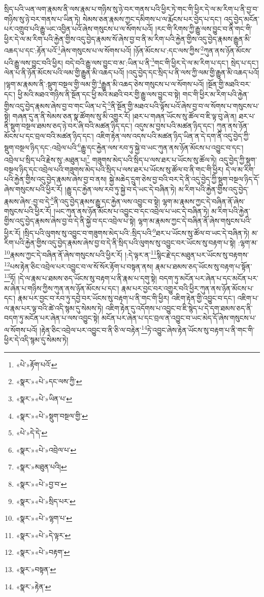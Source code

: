 སྲིད་པའི་ཡན་ལག་རྣམས་ནི་ལས་རྣམ་པ་གཉིས་སུ་ཉེ་བར་གནས་པའི་ཕྱིར་ཏེ་གང་གི་ཕྱིར་དེ་ལ་མ་རིག་པ་ནི་བྱ་བ་གཉིས་སུ་ཉེ་བར་གནས་པ་ཡིན་ཏེ། སེམས་ཅན་རྣམས་ཀྱང་དམིགས་པ་ལ་རྨོངས་པར་བྱེད་པ་དང་། འདུ་བྱེད་མངོན་པར་འགྲུབ་པའི་རྒྱུ་ཡང་འབྱིན་པའོ་ཞེས་གསུངས་པ་ལ་སོགས་པའོ། །རང་གི་རིགས་ཀྱི་རྒྱུ་ལས་བྱུང་བ་ནི་གང་གི་ཕྱིར་དེ་ལ་མ་རིག་པའི་རྐྱེན་གྱིས་འདུ་བྱེད་རྣམས་སོ་ཞེས་བྱ་བ་ནི་མ་རིག་པའི་རྐྱེན་གྱིས་འདུ་བྱེད་རྣམས་རྒྱུན་མི་འཆད་པ་དང་:རྟོན་པའོ་\footnote{«པེ་»རྟོག་པའོ་}ཞེས་གསུངས་པ་ལ་སོགས་པའོ། །ཉོན་མོངས་པ་:དང་ལས་ཀྱིས་\footnote{«སྣར་»«པེ་»དང་ལས་ཀྱི་}ཀུན་ནས་ཉོན་མོངས་པའི་རྒྱུ་ལས་བྱུང་བའི་ཕྱིར། བདེ་བའི་རྒྱུ་ལས་བྱུང་བ་མ་:ཡིན་པ་ནི་\footnote{«སྣར་»«པེ་»ཡིན་པ་}གང་གི་ཕྱིར་དེ་ལ་མ་རིག་པ་དང་། སྲེད་པ་དང་། ལེན་པ་ནི་ཉོན་མོངས་པའི་ལམ་གྱི་རྒྱུན་མི་འཆད་པའོ། །འདུ་བྱེད་དང་སྲིད་པ་ནི་ལས་ཀྱི་ལམ་གྱི་རྒྱུན་མི་འཆད་པའོ། །ལྷག་མ་རྣམས་ནི་:སྡུག་བསྔལ་གྱི་ལམ་གྱི་\footnote{«སྣར་»«པེ་»སྡུག་བསྔལ་གྱི་}རྒྱུན་མི་འཆད་ཅེས་གསུངས་པ་ལ་སོགས་པའོ། །སྔོན་གྱི་མཐའི་བར་དང་། ཕྱི་མའི་མཐའ་གཉིས་ནི་སྔོན་དང་ཕྱི་མའི་མཐའི་བར་གྱི་རྒྱུ་ལས་བྱུང་བ་སྟེ། གང་གི་ཕྱིར་མ་རིག་པའི་རྐྱེན་གྱིས་འདུ་བྱེད་རྣམས་ཞེས་བྱ་བ་གང་ཡིན་པ་དེ་\footnote{«པེ་»དེ་དེ་}ནི་སྔོན་གྱི་མཐའ་པའི་ལྟོས་པའོ་ཞེས་བྱ་བ་ལ་སོགས་པ་གསུངས་པ་སྟེ། གཞན་དུ་ན་ནི་སེམས་ཅན་སྣ་ཚོགས་སུ་མི་འགྱུར་རོ། །ཐར་པ་གཞན་ཡོངས་སུ་ཚོལ་བ་ཇི་ལྟ་བུ་ཞེ་ན། ཐར་པ་ནི་སྡུག་བསྔལ་ཐམས་ཅད་ཉེ་བར་ཞི་བའི་མཚན་ཉིད་དང་། འདུས་མ་བྱས་པའི་མཚན་ཉིད་དང་། ཀུན་ནས་ཉོན་མོངས་པ་དང་བྲལ་བའི་མཚན་ཉིད་དང་། འཇིག་རྟེན་ལས་འདས་པའི་མཚན་ཉིད་ཡིན་ན་དེ་དག་ནི་འདུ་བྱེད་ཀྱི་སྡུག་བསྔལ་ཉིད་དང་:འབྲེལ་པའི་\footnote{«སྣར་»«པེ་»འབྲེལ་པ་}རྒྱུ་དང་རྐྱེན་ལས་རབ་ཏུ་སྐྱེ་བ་ཡང་ཀུན་ནས་ཉོན་མོངས་པ་འབྱུང་བ་དང་། འབྲེལ་པ་སྲིད་པའི་རྗེས་སུ་:མཐུན་པ།\footnote{«སྣར་»མཐུན་པའི།} གཟུགས་མེད་པའི་སྲིད་པ་ལས་ཐར་པ་ཡོངས་སུ་ཚོལ་ཏེ། འདུ་བྱེད་ཀྱི་སྡུག་བསྔལ་ཉིད་དང་འབྲེལ་པའི་གཟུགས་མེད་པའི་སྲིད་པ་ལས་ཐར་པ་ཡོངས་སུ་ཚོལ་བ་ནི་གང་གི་ཕྱིར། དེ་ལ་མ་རིག་པའི་རྐྱེན་གྱིས་འདུ་བྱེད་རྣམས་ཞེས་བྱ་བ་ནས། སྐྱེ་མཆེད་དྲུག་ཅེས་བྱ་བའི་བར་དེ་ནི་འདུ་བྱེད་ཀྱི་སྡུག་བསྔལ་ཉིད་དོ་ཞེས་གསུངས་པའི་ཕྱིར་རོ། །རྒྱུ་དང་རྐྱེན་ལས་རབ་ཏུ་སྐྱེ་བ་དེ་ཡང་དེ་བཞིན་ཏེ། མ་རིག་པའི་རྐྱེན་གྱིས་འདུ་བྱེད་རྣམས་ཞེས་:བྱ་བ་དེ་\footnote{«སྣར་»«པེ་»བྱ་བ་}ནི་འདུ་བྱེད་རྣམས་རྒྱུ་དང་རྐྱེན་ལས་འབྱུང་བ་སྟེ། ལྷག་མ་རྣམས་ཀྱང་དེ་བཞིན་ནོ་ཞེས་གསུངས་པའི་ཕྱིར་རོ། །ཡང་ཀུན་ནས་ཉོན་མོངས་པ་འབྱུང་བ་དང་འབྲེལ་པ་ཡང་དེ་བཞིན་ཏེ། མ་རིག་པའི་རྐྱེན་གྱིས་འདུ་བྱེད་རྣམས་ཞེས་བྱ་བ་དེ་ནི་སྐྱེ་བ་དང་འབྲེལ་པ་སྟེ། ལྷག་མ་རྣམས་ཀྱང་དེ་བཞིན་ནོ་ཞེས་གསུངས་པའི་ཕྱིར་རོ། །སྲིད་པའི་ལུགས་སུ་འབྱུང་བ་གཟུགས་མེད་པའི་:སྲིད་པའི་\footnote{«སྣར་»«པེ་»སྲིད་པར་}ཐར་པ་ཡོངས་སུ་ཚོལ་བ་ཡང་དེ་བཞིན་ཏེ། མ་རིག་པའི་རྐྱེན་གྱིས་འདུ་བྱེད་རྣམས་ཞེས་བྱ་བ་དེ་ནི་སྲིད་པའི་ལུགས་སུ་འབྱུང་བར་ཡོངས་སུ་བརྟག་པ་སྟེ། :ལྷག་མ་\footnote{«སྣར་»«པེ་»ལྷག་པ་}རྣམས་ཀྱང་དེ་བཞིན་ནོ་ཞེས་གསུངས་པའི་ཕྱིར་རོ། །:དེ་ལྟར་ན་\footnote{«སྣར་»«པེ་»དེ་ལྟར་}སྙིང་རྗེ་དང་མཐུན་པར་ཡོངས་སུ་བརྟགས་\footnote{«སྣར་»«པེ་»བརྟག་}པས་རྟེན་ཅིང་འབྲེལ་པར་འབྱུང་བ་ལ་སོ་སོར་རྟོག་པ་བསྟན་ནས། རྣམ་པ་ཐམས་ཅད་ཡོངས་སུ་བརྟག་པ་སྟོན་\footnote{«སྣར་»བསྟན་}ཏོ། །དེ་ལ་རྣམ་པ་ཐམས་ཅད་ཡོངས་སུ་བརྟག་པ་ནི་རྣམ་པ་དགུ་སྟེ། བདག་ཏུ་མངོན་པར་ཞེན་པ་དང་མངོན་པར་མ་ཞེན་པ་གཉིས་ཀྱིས་ཀུན་ནས་ཉོན་མོངས་པ་དང་། རྣམ་པར་བྱང་བར་འགྱུར་བའི་ཕྱིར་ཀུན་ནས་ཉོན་མོངས་པ་དང་། རྣམ་པར་བྱང་བ་རབ་ཏུ་དབྱེ་བར་ཡོངས་སུ་བརྟག་པ་ནི་གང་གི་ཕྱིར། འཇིག་རྟེན་གྱི་འབྱུང་བ་དང་། འཇིག་པ་ལ་རྣམ་པར་ལྟ་བའི་ཚེ་འདི་སྙམ་དུ་སེམས་ཏེ། འཇིག་རྟེན་དུ་འདོགས་པ་འབྱུང་བ་ཇི་སྙེད་པ་དེ་དག་ཐམས་ཅད་ནི་བདག་ཏུ་མངོན་པར་ཞེན་པ་ལས་འབྱུང་སྟེ། མངོན་པར་ཞེན་པ་དང་བྲལ་ན་འབྱུང་བ་ཡང་མེད་དོ་ཞེས་གསུངས་པ་ལ་སོགས་པའོ། །རྟེན་ཅིང་འབྲེལ་པར་འབྱུང་བ་ནི་ཅི་ལ་བརྟེན་\footnote{«སྣར་»རྟེན་}ཏེ་འབྱུང་ཞེས་རྟེན་ཡོངས་སུ་བརྟག་པ་ནི་གང་གི་ཕྱིར་དེ་འདི་སྙམ་དུ་སེམས་ཏེ། 